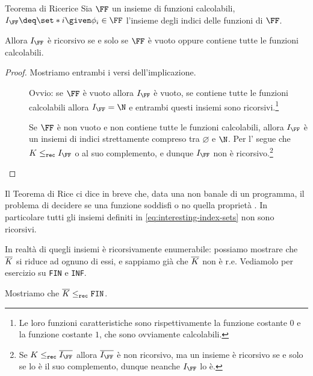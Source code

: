 \begin{theorem}
    {Teorema di Rice}{rice}
    Sia $\FF$ un insieme di funzioni calcolabili, $I_{\FF} \deq \set*{i \given \phi_i \in \FF}$ l'insieme degli indici delle funzioni di $\FF$.
    
    Allora $I_{\FF}$ è ricorsivo se e solo se $\FF$ è vuoto oppure contiene tutte le funzioni calcolabili. 
\end{theorem}
\begin{proof}
    Mostriamo entrambi i versi dell'implicazione.

    \begin{description}
        \item[\boximplby] Ovvio: se $\FF$ è vuoto allora $I_{\FF}$ è vuoto, se contiene tutte le funzioni calcolabili allora $I_{\FF} = \N$ e entrambi questi insiemi sono ricorsivi.\footnote{Le loro funzioni caratteristiche sono rispettivamente la funzione costante $0$ e la funzione costante $1$, che sono ovviamente calcolabili.}
        \item[\boximpl] Se $\FF$ è non vuoto e non contiene tutte le funzioni calcolabili, allora $I_{\FF}$ è un insiemi di indici strettamente compreso tra $\varnothing$ e $\N$. Per l' segue che $K \leq_{\rec} I_{\FF}$ o al suo complemento, e dunque $I_{\FF}$ non è ricorsivo.\footnote{Se $K \leq_{\rec} \compl{I_{\FF}}$ allora $\compl{I_{\FF}}$ è non ricorsivo, ma un insieme è ricorsivo se e solo se lo è il suo complemento, dunque neanche $I_{\FF}$ lo è.}  \qedhere 
    \end{description}
\end{proof}

Il Teorema di Rice ci dice in breve che, data una  non banale di un programma, il problema di decidere se una funzione soddisfi o no quella proprietà . In particolare tutti gli insiemi definiti in \eqref{eq:interesting-index-sets} non sono ricorsivi.

In realtà  di quegli insiemi è ricorsivamente enumerabile: possiamo mostrare che $\overline{K}$ si riduce ad ognuno di essi, e sappiamo già che $\overline{K}$ non è r.e. Vediamolo per esercizio su \texttt{FIN} e \texttt{INF}.

Mostriamo che $\overline{K} \leq_{\texttt{rec}} \texttt{FIN}$.

